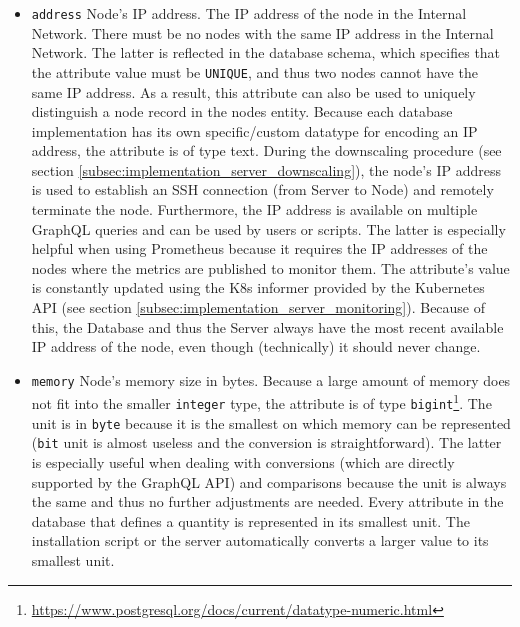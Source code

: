 \begin{itemize}
  \item \texttt{address}
    \newline
    Node's IP address.
    \newline
    The IP address of the node in the Internal Network. There must be no nodes
    with the same IP address in the Internal Network. The latter is reflected in
    the database schema, which specifies that the attribute value must be
    \texttt{UNIQUE}, and thus two nodes cannot have the same IP address. As a result,
    this attribute can also be used to uniquely distinguish a node record in the
    nodes entity.
    \newline
    Because each database implementation has its own specific/custom datatype for
    encoding an IP address, the attribute is of type text.
    \newline
    During the downscaling procedure (see section
    \ref{subsec:implementation_server_downscaling}), the node's IP address is
    used to establish an SSH connection (from Server to Node) and remotely
    terminate the node. Furthermore, the IP address is available on multiple
    GraphQL queries and can be used by users or scripts. The latter is especially
    helpful when using Prometheus because it requires the IP addresses of the nodes
    where the metrics are published to monitor them.
    \newline
    The attribute's value is constantly updated using the K8s informer provided
    by the Kubernetes API (see section \ref{subsec:implementation_server_monitoring}).
    Because of this, the Database and thus the Server always have the most
    recent available IP address of the node, even though (technically) it should
    never change.

  \item \texttt{memory}
    \newline
    Node's memory size in bytes.
    \newline
    Because a large amount of memory does not fit into the smaller \texttt{integer}
    type, the attribute is of type \texttt{bigint}\footnote{\url{https://www.postgresql.org/docs/current/datatype-numeric.html}}.
    \newline
    The unit is in \texttt{byte} because it is the smallest on which memory can
    be represented (\texttt{bit} unit is almost useless and the conversion is
    straightforward). The latter is especially useful when dealing with
    conversions (which are directly supported by the GraphQL API) and
    comparisons because the unit is always the same and thus no further
    adjustments are needed.
    \newline
    Every attribute in the database that defines a quantity is represented in its
    smallest unit. The installation script or the server automatically converts
    a larger value to its smallest unit.


\end{itemize}
